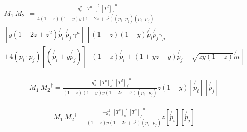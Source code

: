 \begin{equation}
\begin{split}
M_1\: {M_2}^{\dagger} = \frac{-g_s^2 \:\:{[T^a]_o}^l \:{[T^d]_{f^{\prime}}}^n }{4(1-z)(1-y)y(1-2z+z^2)(p_i \cdot p_j)(p_i \cdot p_j)} \\
[y(1-2z+z^2)\not{p_i}\:\not{p_j}\: \gamma^{\mu}] \:[(1-z)(1-y)\not{p_i} \not{p_j} \gamma_{\mu}] \\
+4(p_i \cdot p_j)[(\not{p_i} + y\not{p_j})][(1-z)\not{p_i} + (1+yz-y) \not{p_j} - \sqrt{zy(1-z)}\not{m}]
\end{split}
\end{equation}

\begin{equation}
\begin{split}
M_1\: {M_2}^{\dagger} = \frac{-g_s^2 \:\:{[T^a]_o}^l \:{[T^d]_{f^{\prime}}}^n }{(1-z)(1-y)y(1-2z+z^2)(p_i \cdot p_j)} 
z(1-y)[\not{p_i}][\not{p_j}]
\end{split}
\end{equation}







\begin{equation}
\begin{split}
M_1\: {M_2}^{\dagger} = \frac{-g_s^2 \:\:{[T^a]_o}^l \:{[T^d]_{f^{\prime}}}^n }{(1-z)y(1-2z+z^2)(p_i \cdot p_j)} 
z[\not{p_i}][\not{p_j}]
\end{split}
\end{equation}

\pagebreak

